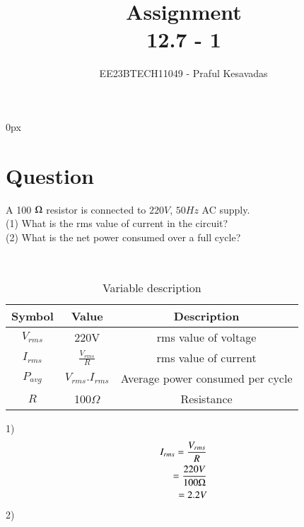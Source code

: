 \documentclass[journal,12pt,twocolumn]{IEEEtran}
\theoremstyle{remark}
\begin{document}
\parindent 0px


\title{Assignment\\[1ex]12.7 - 1}
\author{EE23BTECH11049 - Praful Kesavadas$^{}$%
}
\maketitle
\newpage
\bigskip

\renewcommand{\thefigure}{\theenumi}
\renewcommand{\thetable}{\theenumi}
\section*{Question}
A 100 $\ohm$ resistor is connected to $220 V$, $50 Hz$ AC supply.\\
(1) What is the rms value of current in the circuit?\\
(2) What is the net power consumed over a full cycle?

\solution\\
\begin{table}[ht]
    \centering
    \begin{tabular}{|c|c|c|}
    \hline
   Symbol&Value&Description\\ \hline
   $V_{rms}$&220V&rms value of voltage\\ \hline
   $I_{rms}$&$\frac{V_{rms}}{R}$&rms value of current\\ \hline
   $P_{avg}$&$V_{rms} .I_{rms}$&Average power consumed per cycle\\ \hline
   $R$&100$\Omega$&Resistance \\\hline
    \end{tabular}
    \label{table:1}
    \caption{Variable description}
    
\end{table}
1)
\begin{align*}
I_{rms} = \frac{V_{rms}}{R}\\
  = \frac{220 V}{100 \ohm}\\
= 2.2 V
\end{align*}
2)



\end{document}
